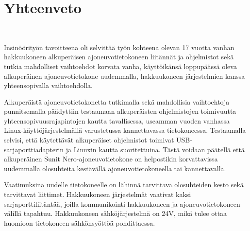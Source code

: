 


\newpage

\chapter{Yhteenveto}\

Insinöörityön tavoitteena oli selvittää työn kohteena olevan 17 vuotta vanhan hakkuukoneen alkuperäisen ajoneuvotietokoneen liitännät ja ohjelmistot sekä tutkia mahdolliset vaihtoehdot korvata vanha, käyttöikänsä loppupäässä oleva alkuperäinen ajoneuvotietokone uudemmalla, hakkuukoneen järjestelmien kanssa yhteensopivalla vaihtoehdolla.

Alkuperäistä ajoneuvotietokonetta tutkimalla sekä mahdollisia vaihtoehtoja punnitsemalla päädyttiin testaamaan alkuperäisten ohjelmistojen toimivuutta yhteensopivuusrajapintojen kautta tavallisessa, useamman vuoden vanhassa Linux-käyttöjärjestelmällä varustetussa kannettavassa tietokoneessa. Testaamalla selvisi, että käytettävät alkuperäiset ohjelmistot toimivat USB-sarjaporttiadapterin ja Linuxin kautta suoritettuina. Tästä voidaan päätellä että alkuperäinen Sunit Nero-ajoneuvotietokone on helpostikin korvattavissa uudemmalla olosuhteita kestävällä ajoneuvotietokoneella tai kannettavalla.

Vaatimuksina uudelle tietokoneelle on lähinnä tarvittava olosuhteiden kesto sekä tarvittavat liittimet. Hakkuukoneen järjestelmät vaativat kaksi sarjaporttiliitäntää, joilla kommunikointi hakkuukoneen ja ajoneuvotietokoneen välillä tapahtuu. Hakkuukoneen sähköjärjestelmä on 24V, mikä tulee ottaa huomioon tietokoneen sähkönsyöttöä pohdittaessa.

\lipsum[12-14]



